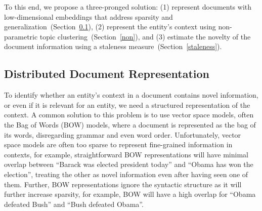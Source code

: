 \documentclass{article}
\begin{document}
To this end, we propose a three-pronged solution:
(1) represent documents with low-dimensional embeddings that address sparsity and generalization~(Section~\ref{docwordemb}), 
(2) represent the entity's context using non-parametric topic clustering~(Section~\ref{non}), and 
(3) estimate the novelty of the document information using a staleness measure~(Section~\ref{staleness}).


\subsection{Distributed Document Representation}
\label{docwordemb}

To identify whether an entity's context in a document contains novel information, or even if it is relevant for an entity, we need a structured representation of the context. %
A common solution to this problem is to use vector space models, often the Bag of Words (BOW) models, where a document is represented as the bag of its words, disregarding grammar and even word order. 
Unfortunately, vector space models are often too sparse to represent fine-grained information in contexts, for example, straightforward BOW representations will have minimal overlap between ``Barack was elected president today'' and ``Obama has won the election'', treating the other as novel information even after having seen one of them.
Further, BOW representations ignore the syntactic structure as it will further increase sparsity, for example, BOW will have a high overlap for ``Obama defeated Bush'' and ``Bush defeated Obama''.
\end{document}
